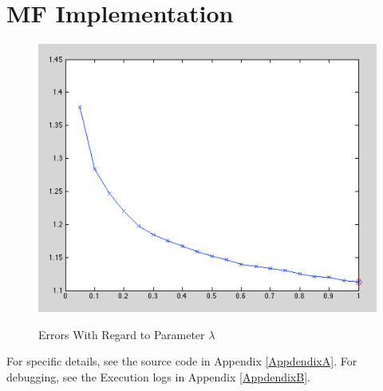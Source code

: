 \documentclass[11pt,a4paper]{article}
\begin{document}
\begin{titlepage}
    \maketitle
\end{titlepage}
\renewcommand{\contentsname}{Contents}
\begin{center} 
    \tableofcontents 
    \listoffigures
\end{center}
\newpage

\newcommand{\uk}{\ensuremath{U^{(K_i)}}}
\newcommand{\ukt}{\ensuremath{U^{(K_i) T}}}
\newcommand{\mk}{\ensuremath{M^{(K_i)}}}
\newcommand{\mkt}{\ensuremath{M^{(K_i) T}}}
\section{MF Implementation}

\begin{figure}[h]
    \centering
    \includegraphics[width=5in,height=3.5in]{./lambda_error.png} \\
    \caption{Errors With Regard to Parameter $\lambda$}
\end{figure}
For specific details, see the source code in Appendix \ref{AppdendixA}.
For debugging, see the Execution logs in Appendix \ref{AppdendixB}.
\end{document}
